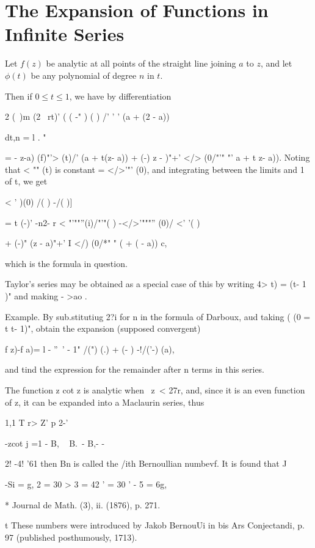 %
%
\chapter{The Expansion of Functions in Infinite Series} 


Let $f(z)$ be analytic at all points of the straight line joining $a$
to $z$, and let $\phi(t)$ be any polynomial of degree $n$ in $t$.

Then if $0 \leq t \leq 1$, we have by differentiation

2 (\ )m (2 \ rt)' ( ( -" ) ( ) /' ' ' (a + (2 - a))

dt,n = l . "

= - z-a) (f)"'> (t)/' (a + t(z- a)) + (-) z - )"+' </> (0/"'" "' a + t
z- a)). Noting that < "" (t) is constant = </>'"' (0), and integrating
between the limits and 1 of t, we get

< ' )(0) /( ) -/( )]

= t (-)' -n2- r < "'""''(i)/"'"( ) -</>'"""'' (0)/ <' '( )

+ (-)" (z - a)"+' I </) (0/*" " ( + ( - a)) c,

which is the formula in question.

Taylor's series may be obtained as a special case of this by writing
4> t) = (t- 1 )" and making - >ao .

Example. By sub.stitutiug 2?i for n in the formula of Darboux, aud
taking ( (0 = t t- 1)", obtain the expansion (supposed convergent)

f z)-f a)= l - ''~' - 1" /(") (.) + (- ) -!/('-) (a),

and tind the expression for the remainder after n terms in this
series.


The function z cot z is analytic when \ z\ < 27r, and, since it is an
even function of z, it can be expanded into a Maclaurin series, thus

1,1 T r> Z' p 2-'

-zcot j =1 - B, ~ B.~- B,- -

2! -4! '61 then Bn is called the /ith Bernoullian numbevf. It is found
that J

-Si = g, 2 = 30 > 3 = 42 ' = 30 ' - 5 = 6g,    

* Journal de Math. (3), ii. (1876), p. 271.

t These numbers were introduced by Jakob BernouUi in bis Ars
Conjectandi, p. 97 (published posthumously, 1713).

